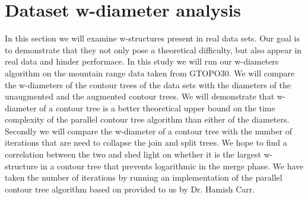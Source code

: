 
%
%


\section {Dataset w-diameter analysis}

In this section we will examine w-structures present in real data sets. Our goal is to demonstrate that they not only pose a theoretical difficulty, but also appear in real data and hinder performace. In this study we will run our w-diameters algorithm on the mountain range data taken from GTOPO30. We will compare the w-diameters of the contour trees of the data sets with the diameters of the unaugmented and the augmented contour trees. We will demonstrate that w-diameter of a contour tree is a better theoretical upper bound on the time complexity of the parallel contour tree algorithm than either of the diameters. Secondly we will compare the w-diameter of a contour tree with the number of iterations that are need to collapse the join and split trees. We hope to find a correlation between the two and shed light on whether it is the largest w-structure in a contour tree that prevents logarithmic in the merge phase. We have taken the number of iterations by running an implementation of the parallel contour tree algorithm based on \cite{parallel-peak-pruning} provided to us by Dr. Hamish Carr.

